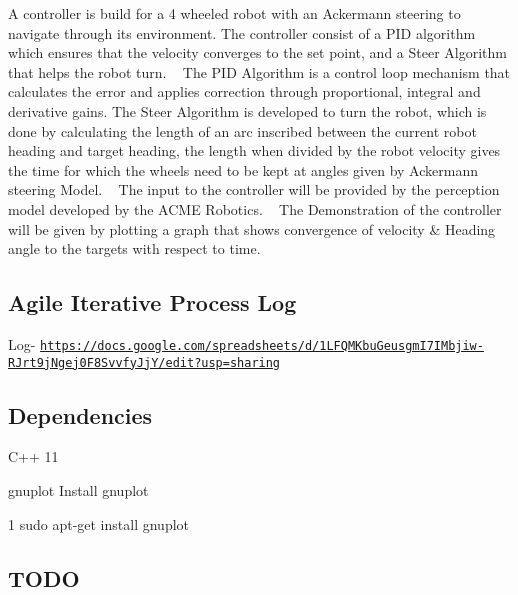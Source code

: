 A controller is build for a 4 wheeled robot with an Ackermann steering to navigate through its environment. The controller consist of a P\+ID algorithm which ensures that the velocity converges to the set point, and a Steer Algorithm that helps the robot turn. ~\newline
The P\+ID Algorithm is a control loop mechanism that calculates the error and applies correction through proportional, integral and derivative gains. The Steer Algorithm is developed to turn the robot, which is done by calculating the length of an arc inscribed between the current robot heading and target heading, the length when divided by the robot velocity gives the time for which the wheels need to be kept at angles given by Ackermann steering Model. ~\newline
The input to the controller will be provided by the perception model developed by the A\+C\+ME Robotics. ~\newline
The Demonstration of the controller will be given by plotting a graph that shows convergence of velocity \& Heading angle to the targets with respect to time.

\subsection*{Agile Iterative Process Log}

Log-\/ \href{https://docs.google.com/spreadsheets/d/1LFQMKbuGeusgmI7IMbjiw-RJrt9jNgej0F8SvvfyJjY/edit?usp=sharing}{\tt https\+://docs.\+google.\+com/spreadsheets/d/1\+L\+F\+Q\+M\+Kbu\+Geusgm\+I7\+I\+Mbjiw-\/\+R\+Jrt9j\+Ngej0\+F8\+Svvfy\+Jj\+Y/edit?usp=sharing}

\subsection*{Dependencies}


\begin{DoxyEnumerate}
\item C++ 11
\item gnuplot Install gnuplot 
\begin{DoxyCode}
1 sudo apt-get install gnuplot
\end{DoxyCode}

\end{DoxyEnumerate}

\subsection*{T\+O\+DO}


